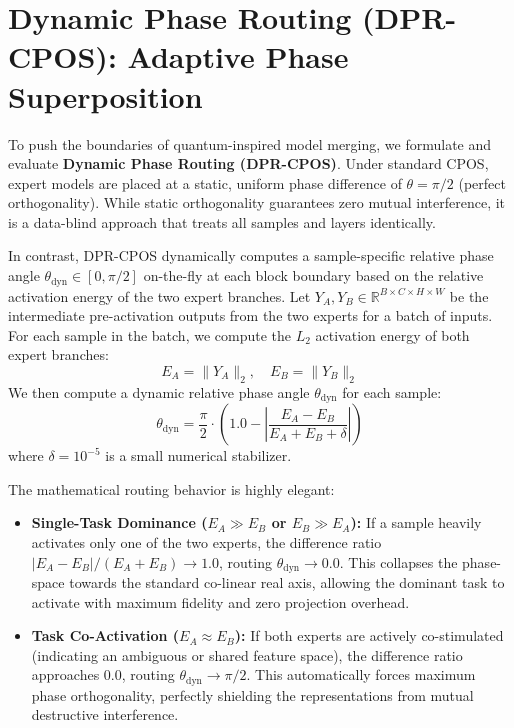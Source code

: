 \documentclass{article}
\theoremstyle{plain}
\theoremstyle{definition}
\theoremstyle{remark}
\begin{document}
\section{Dynamic Phase Routing (DPR-CPOS): Adaptive Phase Superposition}
\label{subsec:dpr_cpos}
To push the boundaries of quantum-inspired model merging, we formulate and evaluate \textbf{Dynamic Phase Routing (DPR-CPOS)}. Under standard CPOS, expert models are placed at a static, uniform phase difference of $\theta = \pi/2$ (perfect orthogonality). While static orthogonality guarantees zero mutual interference, it is a data-blind approach that treats all samples and layers identically. 

In contrast, DPR-CPOS dynamically computes a sample-specific relative phase angle $\theta_{\text{dyn}} \in [0, \pi/2]$ on-the-fly at each block boundary based on the relative activation energy of the two expert branches. Let $Y_A, Y_B \in \mathbb{R}^{B \times C \times H \times W}$ be the intermediate pre-activation outputs from the two experts for a batch of inputs. For each sample in the batch, we compute the $L_2$ activation energy of both expert branches:
\begin{equation}
E_A = \|Y_A\|_2, \quad E_B = \|Y_B\|_2
\end{equation}
We then compute a dynamic relative phase angle $\theta_{\text{dyn}}$ for each sample:
\begin{equation}
\theta_{\text{dyn}} = \frac{\pi}{2} \cdot \left( 1.0 - \left| \frac{E_A - E_B}{E_A + E_B + \delta} \right| \right)
\end{equation}
where $\delta = 10^{-5}$ is a small numerical stabilizer. 

The mathematical routing behavior is highly elegant:
\begin{itemize}
\item \textbf{Single-Task Dominance ($E_A \gg E_B$ or $E_B \gg E_A$):} If a sample heavily activates only one of the two experts, the difference ratio $|E_A - E_B| / (E_A + E_B) \to 1.0$, routing $\theta_{\text{dyn}} \to 0.0$. This collapses the phase-space towards the standard co-linear real axis, allowing the dominant task to activate with maximum fidelity and zero projection overhead.
\item \textbf{Task Co-Activation ($E_A \approx E_B$):} If both experts are actively co-stimulated (indicating an ambiguous or shared feature space), the difference ratio approaches $0.0$, routing $\theta_{\text{dyn}} \to \pi/2$. This automatically forces maximum phase orthogonality, perfectly shielding the representations from mutual destructive interference.
\end{itemize}
\end{document}
